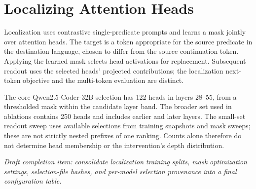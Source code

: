 \section{Localizing Attention Heads}
\label{app:head_loc}
Localization uses contrastive single-predicate prompts and learns a mask jointly over attention heads. The target is a token appropriate for the source predicate in the destination language, chosen to differ from the source continuation token. Applying the learned mask selects head activations for replacement. Subsequent readout uses the selected heads' projected contributions; the localization next-token objective and the multi-token evaluation are distinct.

The core Qwen2.5-Coder-32B selection has 122 heads in layers 28--55, from a thresholded mask within the candidate layer band. The broader set used in ablations contains 250 heads and includes earlier and later layers. The small-set readout sweep uses available selections from training snapshots and mask sweeps; these are not strictly nested prefixes of one ranking. Counts alone therefore do not determine head membership or the intervention's depth distribution.

\textit{Draft completion item: consolidate localization training splits, mask optimization settings, selection-file hashes, and per-model selection provenance into a final configuration table.}
